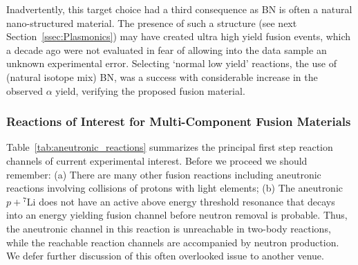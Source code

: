\documentclass[particles,article,accept,pdftex,moreauthors]{Definitions/mdpi}
\begin{document}
Inadvertently, this target choice had a third consequence as BN is often a natural nano-structured material. The presence of such a structure (see next Section~\ref{ssec:Plasmonics}) may have created ultra high yield fusion events, which a decade ago were not evaluated in fear of allowing into the data sample an unknown experimental error. Selecting `normal low yield' reactions, the use of (natural isotope mix) BN, was a success with considerable increase in the observed $\alpha$ yield, verifying the proposed fusion material.

\subsubsection{Reactions of Interest for Multi-Component Fusion Materials}
Table~\ref{tab:aneutronic_reactions} summarizes the principal first step reaction channels of current experimental interest. Before we proceed we should remember: (a) There are many other fusion reactions including aneutronic reactions involving collisions of protons with light elements; (b) The aneutronic $p + {}^{7}\mathrm{Li}$ does not have an active above energy threshold resonance that decays into an energy yielding fusion channel before neutron removal is probable. Thus, the aneutronic channel in this reaction is unreachable in two-body reactions, while the reachable reaction channels are accompanied by neutron production. We defer further discussion of this often overlooked issue to another venue.
\end{document}
